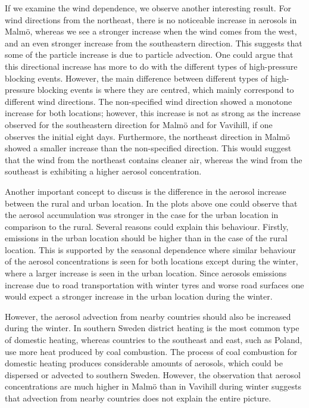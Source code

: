 If we examine the wind dependence, we observe another interesting result. For wind directions from the northeast, there is no noticeable increase in aerosols in Malmö, whereas we see a stronger increase when the wind comes from the west, and an even stronger increase from the southeastern direction. This suggests that some of the particle increase is due to particle advection. One could argue that this directional increase has more to do with the different types of high-pressure blocking events. However, the main difference between different types of high-pressure blocking events is where they are centred, which mainly correspond to different wind directions. The non-specified wind direction showed a monotone increase for both locations; however, this increase is not as strong as the increase observed for the southeastern direction for Malmö and for Vavihill, if one observes the initial eight days. Furthermore, the northeast direction in Malmö showed a smaller increase than the non-specified direction. This would suggest that the wind from the northeast contains cleaner air, whereas the wind from the southeast is exhibiting a higher aerosol concentration. 

Another important concept to discuss is the difference in the aerosol increase between the rural and urban location. In the plots above one could observe that the aerosol accumulation was stronger in the case for the urban location in comparison to the rural. Several reasons could explain this behaviour. Firstly, emissions in the urban location should be higher than in the case of the rural location. This is supported by the seasonal dependence where similar behaviour of the aerosol concentrations is seen for both locations except during the winter, where a larger increase is seen in the urban location. Since aerosols emissions increase due to road transportation with winter tyres and worse road surfaces one would expect a stronger increase in the urban location during the winter. 

However, the aerosol advection from nearby countries should also be increased during the winter. In southern Sweden district heating is the most common type of domestic heating, whereas countries to the southeast and east, such as Poland, use more heat produced by coal combustion. The process of coal combustion for domestic heating produces considerable amounts of aerosols, which could be dispersed or advected to southern Sweden. However, the observation that aerosol concentrations are much higher in Malmö than in Vavihill during winter suggests that advection from nearby countries does not explain the entire picture.

